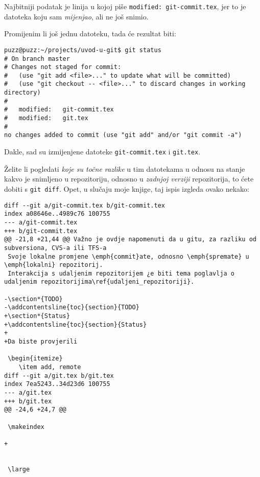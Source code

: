 Najbitniji podatak je linija u kojoj piše \verb+modified: git-commit.tex+, jer to je datoteka koju sam \emph{mijenjao}, ali ne još snimio.

Promijenim li još jednu datoteku, tada će rezultat biti:

\begin{verbatim}
puzz@puzz:~/projects/uvod-u-git$ git status
# On branch master
# Changes not staged for commit:
#   (use "git add <file>..." to update what will be committed)
#   (use "git checkout -- <file>..." to discard changes in working directory)
#
#	modified:   git-commit.tex
#	modified:   git.tex
#
no changes added to commit (use "git add" and/or "git commit -a")
\end{verbatim}

Dakle, sad su izmijenjene datoteke \verb+git-commit.tex+ i \verb+git.tex+.

Želite li pogledati \emph{koje su točne razlike} u tim datotekama u odnosu na stanje kakvo je snimljeno u repozitoriju, odnosno u \emph{zadnjoj verziji} repozitorija, to ćete dobiti s \verb+git diff+. 
Opet, u slučaju moje knjige, taj ispis izgleda ovako nekako:

\begin{verbatim}
diff --git a/git-commit.tex b/git-commit.tex
index a08646e..4989c76 100755
--- a/git-commit.tex
+++ b/git-commit.tex
@@ -21,8 +21,44 @@ Važno je ovdje napomenuti da u gitu, za razliku od subversiona, CVS-a ili TFS-a
 Svoje lokalne promjene \emph{commit}ate, odnosno \emph{spremate} u \emph{lokalni} repozitorij.
 Interakcija s udaljenim repozitorijem ¿e biti tema poglavlja o udaljenim repozitorijima\ref{udaljeni_repozitoriji}.
 
-\section*{TODO}
-\addcontentsline{toc}{section}{TODO}
+\section*{Status}
+\addcontentsline{toc}{section}{Status}
+
+Da biste provjerili 
 
 \begin{itemize}
    \item add, remote
diff --git a/git.tex b/git.tex
index 7ea5243..34d23d6 100755
--- a/git.tex
+++ b/git.tex
@@ -24,6 +24,7 @@
 
 \makeindex
 
+
 
 
 \large

\end{verbatim}


